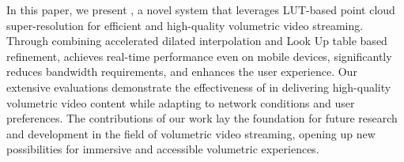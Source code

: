 In this paper, we present \name, a novel system that leverages LUT-based point cloud super-resolution for efficient and high-quality volumetric video streaming. Through combining accelerated dilated interpolation and Look Up table based refinement, \name achieves real-time performance even on mobile devices, significantly reduces bandwidth requirements, and enhances the user experience. Our extensive evaluations demonstrate the effectiveness of \name in delivering high-quality volumetric video content while adapting to network conditions and user preferences. The contributions of our work lay the foundation for future research and development in the field of volumetric video streaming, opening up new possibilities for immersive and accessible volumetric experiences.